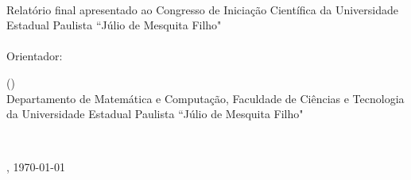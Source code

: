 \newpage
\thispagestyle{empty}
\begin{center}
    \nome\\
    \href{mailto:\email}{\email}
\end{center}
\vspace{2cm}
\begin{center}
    \titulo
\end{center}
\vspace{2cm}
Relatório final apresentado ao Congresso de Iniciação Científica da Universidade Estadual Paulista ``Júlio de Mesquita Filho"
\\
\vspace{3cm}
\\
Orientador:
\hspace{5mm}
\begin{minipage}[t]{11cm}
    \orientador\;(\href{mailto:\emailorientador}{\emailorientador})\\
    Departamento de Matemática e Computação, Faculdade de Ciências e Tecnologia da Universidade Estadual Paulista ``Júlio de Mesquita Filho"\\
\end{minipage}\\

\vspace*{\fill}

\begin{center}
    \cidade, \today
\end{center}